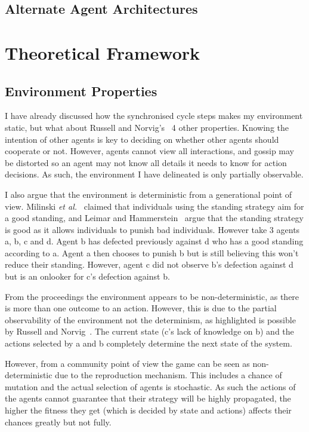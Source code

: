 \documentclass[]{final_report}
\begin{document}
\subsection{Alternate Agent Architectures}

\section{Theoretical Framework}
\subsection{Environment Properties}
\label{appendix:envprop}
I have already discussed how the synchronised cycle steps makes my environment static, but what about Russell and Norvig's~\cite{russell2016artificial} 4 other properties. Knowing the intention of other agents is key to deciding on whether other agents should cooperate or not. However, agents cannot view all interactions, and gossip may be distorted so an agent may not know all details it needs to know for action decisions. As such, the environment I have delineated is only partially observable.\par
I also argue that the environment is deterministic from a generational point of view. Milinski \textit{et al.}~\cite{imagevsstanding} claimed that individuals using the standing strategy aim for a good standing, and Leimar and Hammerstein~\cite{leimarhammer} argue that the standing strategy is good as it allows individuals to punish bad individuals. However take 3 agents a, b, c and d. Agent b has defected previously against d who has a good standing according to a. Agent a then chooses to punish b but is still believing this won't reduce their standing. However, agent c did not observe b's defection against d but is an onlooker for c's defection against b.\par
From the proceedings the environment appears to be non-deterministic, as there is more than one outcome to an action. However, this is due to the partial observability of the environment not the determinism, as highlighted is possible by Russell and Norvig~\cite{russell2016artificial}. The current state (c's lack of knowledge on b) and the actions selected by a and b completely determine the next state of the system.\par
However, from a community point of view the game can be seen as non-deterministic due to the reproduction mechanism. This includes a chance of mutation and the actual selection of agents is stochastic. As such the actions of the agents cannot guarantee that their strategy will be highly propagated, the higher the fitness they get (which is decided by state and actions) affects their chances greatly but not fully.\par
\end{document}
